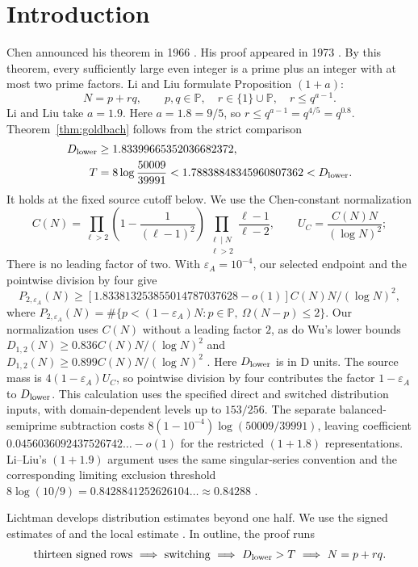 \documentclass{amsart}
\numberwithin{equation}{section}
\numberwithin{table}{section}
\theoremstyle{definition}
\begin{document}
\section{Introduction}
Chen announced his theorem in 1966 \cite{Chen1966}.
His proof appeared in 1973 \cite{Chen1973}.
By this theorem, every sufficiently large even integer is a prime plus an integer
with at most two prime factors.
Li and Liu \cite{LiLiu2026} formulate Proposition $(1+a)$:
\[
 N=p+rq,\qquad p,q\in\mathbb P,\quad r\in\{1\}\cup\mathbb P,
 \quad r\le q^{a-1}.
\]
Li and Liu take $a=1.9$. Here $a=1.8=9/5$, so
$r\le q^{a-1}=q^{4/5}=q^{0.8}$.
Theorem~\ref{thm:goldbach} follows from the strict comparison
\[
 \begin{aligned}
 D_{\rm lower}&\ge1.83399665352036682372,\\
 T&=8\log\frac{50009}{39991}<1.78838848345960807362<D_{\rm lower}.
 \end{aligned}
\]
It holds at the fixed source cutoff below.
We use the Chen-constant normalization
\[
 C(N)=\prod_{\ell>2}\left(1-\frac1{(\ell-1)^2}\right)
       \prod_{\substack{\ell\mid N\\\ell>2}}\frac{\ell-1}{\ell-2},
 \qquad U_C=\frac{C(N)N}{(\log N)^2};
\]
There is no leading factor of two. With $\varepsilon_A=10^{-4}$,
our selected endpoint and the pointwise division by four give
\[
 P_{2,\varepsilon_A}(N)\ge
 [1.833813253855014787037628-o(1)]C(N)N/(\log N)^2,
\]
where $P_{2,\varepsilon_A}(N)=\#\{p<(1-\varepsilon_A)N:
p\in\mathbb P,\ \Omega(N-p)\le2\}$.
Our normalization uses $C(N)$ without a leading factor $2$, as do Wu's lower
bounds $D_{1,2}(N)\ge0.836C(N)N/(\log N)^2$
\cite[Theorem~2]{Wu2004} and
$D_{1,2}(N)\ge0.899C(N)N/(\log N)^2$ \cite{Wu2008}.
Here $D_{\rm lower}$ is in D units. The source mass is
$4(1-\varepsilon_A)U_C$, so pointwise division by four contributes the
factor $1-\varepsilon_A$ to $D_{\rm lower}$.
This calculation uses the specified direct and switched distribution inputs,
with domain-dependent levels up to $153/256$.
The separate balanced-semiprime subtraction costs
$8(1-10^{-4})\log(50009/39991)$, leaving coefficient
$0.0456036092437526742\ldots-o(1)$ for the restricted $(1+1.8)$
representations.
Li--Liu's $(1+1.9)$ argument uses the same singular-series convention and
the corresponding limiting exclusion threshold
$8\log(10/9)=0.8428841252626104\ldots\approx0.84288$
\cite[(5.42)--(5.43)]{LiLiu2026}.

Lichtman \cite{Lichtman} develops distribution estimates beyond one half.
We use the signed estimates of \cite[Theorems~1.1--1.2]{Z1}
and the local estimate \cite[Theorem~3.2, (3.13)]{Z1}.
In outline, the proof runs
\[
 \text{thirteen signed rows}\ \Longrightarrow\ \text{switching}
 \ \Longrightarrow\ D_{\rm lower}>T
 \ \Longrightarrow\ N=p+rq.
\]
\end{document}
